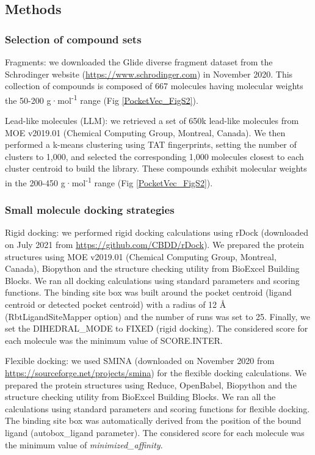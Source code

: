 \subsection{Methods}
\label{PocketVec_Methods}

\subsubsection{Selection of compound sets}

Fragments: we downloaded the Glide\cite{friesner_glide_2004, halgren_glide_2004} diverse fragment dataset from the Schrodinger website (\href{https://www.schrodinger.com}{https://www.schrodinger.com}) in November 2020. This collection of compounds is composed of 667 molecules having molecular weights the 50-200 g·mol\textsuperscript{-1} range (Fig \ref{PocketVec_FigS2}).

Lead-like molecules (LLM): we retrieved a set of 650k lead-like molecules from MOE v2019.01 (Chemical Computing Group, Montreal, Canada). We then performed a k-means clustering using TAT fingerprints, setting the number of clusters to 1,000, and selected the corresponding 1,000 molecules closest to each cluster centroid to build the library. These compounds exhibit molecular weights in the 200-450 g·mol\textsuperscript{-1} range (Fig \ref{PocketVec_FigS2}). 

\subsubsection{Small molecule docking strategies}

Rigid docking: we performed rigid docking calculations using rDock\cite{ruiz-carmona_rdock_2014} (downloaded on July 2021 from \href{https://github.com/CBDD/rDock}{https://github.com/CBDD/rDock}). We prepared the protein structures using MOE v2019.01 (Chemical Computing Group, Montreal, Canada), Biopython\cite{cock_biopython_2009} and the structure checking utility from BioExcel Building Blocks\cite{andrio_bioexcel_2019}. We ran all docking calculations using standard parameters and scoring functions. The binding site box was built around the pocket centroid (ligand centroid or detected pocket centroid) with a radius of 12 Å (RbtLigandSiteMapper option) and the number of runs was set to 25. Finally, we set the DIHEDRAL\_MODE to FIXED (rigid docking). The considered score for each molecule was the minimum value of SCORE.INTER.

Flexible docking: we used SMINA\cite{koes_lessons_2013} (downloaded on November 2020 from \href{https://sourceforge.net/projects/smina}{https://sourceforge.net/projects/smina}) for the flexible docking calculations. We prepared the protein structures using Reduce\cite{word_asparagine_1999}, OpenBabel\cite{oboyle_open_2011}, Biopython\cite{cock_biopython_2009} and the structure checking utility from BioExcel Building Blocks\cite{andrio_bioexcel_2019}. We ran all the calculations using standard parameters and scoring functions for flexible docking. The binding site box was automatically derived from the position of the bound ligand (autobox\_ligand parameter). The considered score for each molecule was the minimum value of \textit{minimized\_affinity}. 


